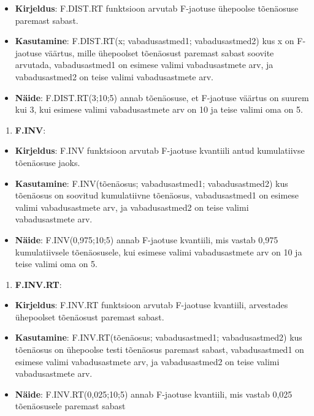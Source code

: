 \documentclass[
]{book}
\providecommand{\tightlist}{%
  \setlength{\itemsep}{0pt}\setlength{\parskip}{0pt}}
\begin{document}
\begin{itemize}
\tightlist
\item
  \textbf{Kirjeldus}: F.DIST.RT funktsioon arvutab F-jaotuse ühepoolse tõenäosuse paremast sabast.
\item
  \textbf{Kasutamine}: F.DIST.RT(x; vabadusastmed1; vabadusastmed2) kus x on F-jaotuse väärtus, mille ühepoolset tõenäosust paremast sabast soovite arvutada, vabadusastmed1 on esimese valimi vabadusastmete arv, ja vabadusastmed2 on teise valimi vabadusastmete arv.
\item
  \textbf{Näide}: F.DIST.RT(3;10;5) annab tõenäosuse, et F-jaotuse väärtus on suurem kui 3, kui esimese valimi vabadusastmete arv on 10 ja teise valimi oma on 5.
\end{itemize}

\begin{enumerate}
\def\labelenumi{\arabic{enumi}.}
\setcounter{enumi}{2}
\tightlist
\item
  \textbf{F.INV}:
\end{enumerate}

\begin{itemize}
\tightlist
\item
  \textbf{Kirjeldus}: F.INV funktsioon arvutab F-jaotuse kvantiili antud kumulatiivse tõenäosuse jaoks.
\item
  \textbf{Kasutamine}: F.INV(tõenäosus; vabadusastmed1; vabadusastmed2) kus tõenäosus on soovitud kumulatiivne tõenäosus, vabadusastmed1 on esimese valimi vabadusastmete arv, ja vabadusastmed2 on teise valimi vabadusastmete arv.
\item
  \textbf{Näide}: F.INV(0,975;10;5) annab F-jaotuse kvantiili, mis vastab 0,975 kumulatiivsele tõenäosusele, kui esimese valimi vabadusastmete arv on 10 ja teise valimi oma on 5.
\end{itemize}

\begin{enumerate}
\def\labelenumi{\arabic{enumi}.}
\setcounter{enumi}{3}
\tightlist
\item
  \textbf{F.INV.RT}:
\end{enumerate}

\begin{itemize}
\tightlist
\item
  \textbf{Kirjeldus}: F.INV.RT funktsioon arvutab F-jaotuse kvantiili, arvestades ühepoolset tõenäosust paremast sabast.
\item
  \textbf{Kasutamine}: F.INV.RT(tõenäosus; vabadusastmed1; vabadusastmed2) kus tõenäosus on ühepoolse testi tõenäosus paremast sabast, vabadusastmed1 on esimese valimi vabadusastmete arv, ja vabadusastmed2 on teise valimi vabadusastmete arv.
\item
  \textbf{Näide}: F.INV.RT(0,025;10;5) annab F-jaotuse kvantiili, mis vastab 0,025 tõenäosusele paremast sabast
\end{itemize}
\end{document}
